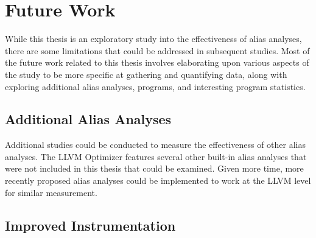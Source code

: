 \chapter{Future Work}

While this thesis is an exploratory study into the effectiveness of alias analyses, there are some limitations that could be addressed in subsequent studies. Most of the future work related to this thesis involves elaborating upon various aspects of the study to be more specific at gathering and quantifying data, along with exploring additional alias analyses, programs, and interesting program statistics.

\section{Additional Alias Analyses}
Additional studies could be conducted to measure the effectiveness of other alias analyses. The LLVM Optimizer features several other built-in alias analyses that were not included in this thesis that could be examined. Given more time, more recently proposed alias analyses could be implemented to work at the LLVM level for similar measurement.

\section{Improved Instrumentation}
